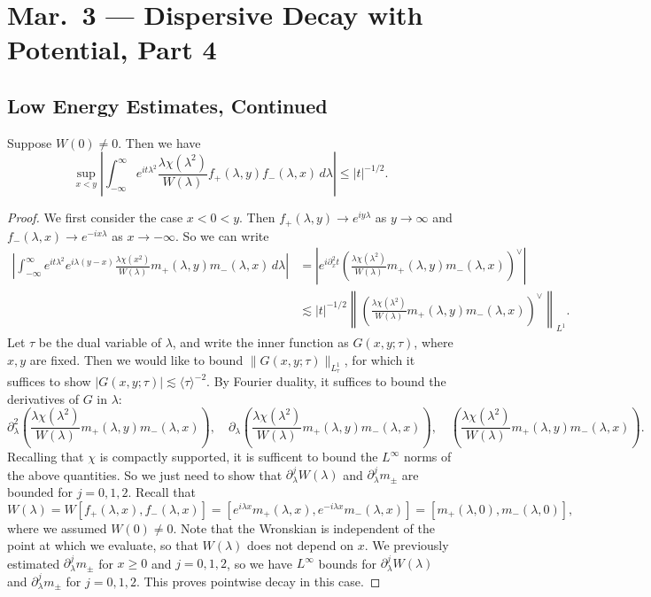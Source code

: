 \chapter{Mar.~3 --- Dispersive Decay with Potential, Part 4}

\section{Low Energy Estimates, Continued}
\begin{lemma}
  Suppose $W(0) \ne 0$. Then we have
  \[
    \sup_{x < y} \left|\int_{-\infty}^\infty e^{it\lambda^2} \frac{\lambda \chi(\lambda^2)}{W(\lambda)} f_+(\lambda, y) f_-(\lambda, x)\, d\lambda\right|
    \le |t|^{-1 / 2}.
  \]
\end{lemma}

\begin{proof}
  We first consider the case $x < 0 < y$. Then
  $f_+(\lambda, y) \to e^{i y \lambda}$ as
  $y \to \infty$ and
  $f_-(\lambda, x) \to e^{-i x \lambda}$ as
  $x \to -\infty$. So we can write
  \begin{align*}
    \left|\int_{-\infty}^\infty e^{it\lambda^2} e^{i\lambda(y - x)} \frac{\lambda \chi(x^2)}{W(\lambda)} m_+(\lambda, y)m_-(\lambda, x)\, d\lambda\right|
    &= \left|e^{i\partial_x^2 t} \left( \frac{\lambda \chi(\lambda^2)}{W(\lambda)} m_+(\lambda, y) m_-(\lambda, x)\right)^\vee\right| \\
    &\lesssim |t|^{-1 / 2}
    \left\| \left(\frac{\lambda \chi(\lambda^2)}{W(\lambda)} m_+(\lambda, y) m_-(\lambda, x)\right)^\vee \right\|_{L^1}.
  \end{align*}
  Let $\tau$ be the dual variable of $\lambda$, and
  write the inner function as $G(x, y; \tau)$, where
  $x, y$ are fixed. Then we would like to bound
  $\|G(x, y; \tau)\|_{L^1_\tau}$, for which
  it suffices to show $|G(x, y; \tau)| \lesssim \langle \tau \rangle^{-2}$.
  By Fourier duality, it suffices to bound
  the derivatives of $G$ in $\lambda$:
  \[
    \partial_\lambda^2 \left(\frac{\lambda \chi(\lambda^2)}{W(\lambda)} m_+(\lambda, y) m_-(\lambda, x)\right), \quad
    \partial_\lambda \left(\frac{\lambda \chi(\lambda^2)}{W(\lambda)} m_+(\lambda, y) m_-(\lambda, x)\right), \quad
    \left(\frac{\lambda \chi(\lambda^2)}{W(\lambda)} m_+(\lambda, y) m_-(\lambda, x)\right).
  \]
  Recalling that $\chi$ is compactly supported, it
  is sufficent to bound the $L^\infty$ norms of the
  above quantities. So we just need to show that
  $\partial_{\lambda}^j W(\lambda)$ and
  $\partial_{\lambda}^j m_\pm$
  are bounded for $j = 0, 1, 2$. Recall that
  \[
    W(\lambda)
    = W[f_+(\lambda, x), f_-(\lambda, x)]
    = [e^{i\lambda x} m_+(\lambda, x), e^{-i\lambda x} m_-(\lambda, x)]
    = [m_+(\lambda, 0), m_-(\lambda, 0)],
  \]
  where we assumed $W(0) \ne 0$.
  Note that the Wronskian is independent of the point
  at which we evaluate, so that $W(\lambda)$
  does not depend on $x$. We previously
  estimated
  $\partial_\lambda^j m_\pm$ for $x \ge 0$ and
  $j = 0, 1, 2$, so we have $L^\infty$ bounds
  for $\partial_\lambda^j W(\lambda)$ and
  $\partial_\lambda^j m_\pm$ for $j = 0, 1, 2$.
  This proves pointwise decay in this case.


\end{proof}
